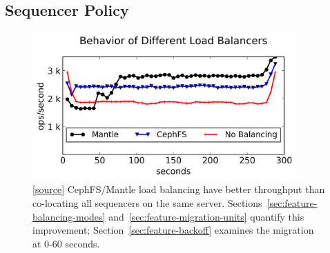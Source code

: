 \subsection{Sequencer Policy}
\label{sec:evaluation} 

\begin{figure}[t!]
\centering
\includegraphics[width=0.9\textwidth]{./chapters/controlplane/malacology/figures/mantle-balancer-behaviors.png}
\caption{
[\href{https://github.com/michaelsevilla/malacology-popper/blob/v2.1/experiments/mds-zlog-seq-migrate-redux-3client/results-mantle-runs/visualize.ipynb}{source}]
CephFS/Mantle load balancing have better throughput than co-locating all
sequencers on the same server.  Sections~\ref{sec:feature-balancing-modes}
and~\ref{sec:feature-migration-units} quantify this improvement;
Section~\ref{sec:feature-backoff} examines the migration at 0-60 seconds.
}\label{fig:mantle-balancer-behaviors}
\end{figure}

